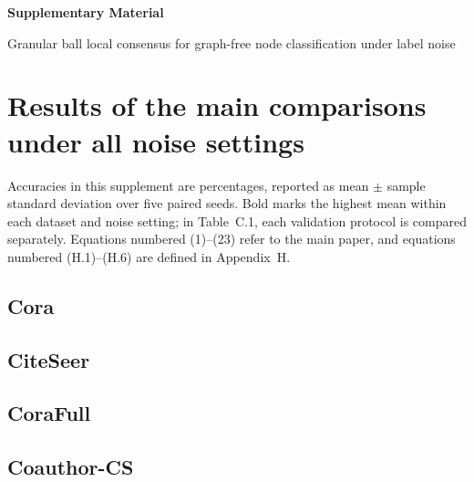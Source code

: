 \documentclass[10pt,letterpaper,nopreprintline]{elsarticle}
\begin{document}
\begin{center}{\Large\bfseries Supplementary Material}\par\medskip Granular ball local consensus for graph-free node classification under label noise\end{center}

\appendix
\renewcommand{\thetable}{\Alph{section}.\arabic{table}}
\renewcommand{\theHtable}{\Alph{section}.\arabic{table}}


\FloatBarrier

\setcounter{table}{0}

\section{Results of the main comparisons under all noise settings}\label{sec:A}

Accuracies in this supplement are percentages, reported as mean \(\pm\) sample standard deviation over five paired seeds. Bold marks the highest mean within each dataset and noise setting; in Table~C.1, each validation protocol is compared separately. Equations numbered (1)--(23) refer to the main paper, and equations numbered (H.1)--(H.6) are defined in Appendix~H.

\Needspace{120pt}

\subsection{Cora}\label{sec:A.1}



\Needspace{120pt}

\subsection{CiteSeer}\label{sec:A.2}



\Needspace{120pt}

\subsection{CoraFull}\label{sec:A.3}



\Needspace{120pt}

\subsection{Coauthor-CS}\label{sec:A.4}
\end{document}
